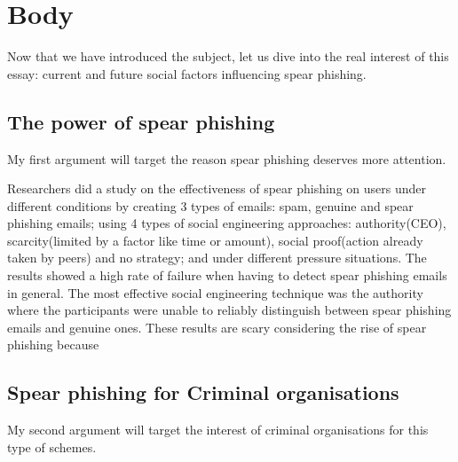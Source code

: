 \documentclass[12pt]{article} %
\begin{document}

\section{Body}
Now that we have introduced the subject, let us dive into the real interest of this essay: current and future social factors influencing spear phishing.
\subsection{The power of spear phishing}
My first argument will target the reason spear phishing deserves more attention.

Researchers did a study on the effectiveness of spear phishing\cite{human firewall} on users under different conditions by creating 3 types of emails: spam, genuine and spear phishing emails; using 4 types of social engineering approaches: authority(CEO), scarcity(limited by a factor like time or amount), social proof(action already taken by peers) and no strategy; and under different pressure situations. The results showed a high rate of failure when having to detect spear phishing emails in general. The most effective social engineering technique was the authority where the participants were unable to reliably distinguish between spear phishing emails and genuine ones. These results are scary considering the rise of spear phishing because \cite{state of phishing}

\subsection{Spear phishing for Criminal organisations}
My second argument will target the interest of criminal organisations for this type of schemes.
\end{document}
